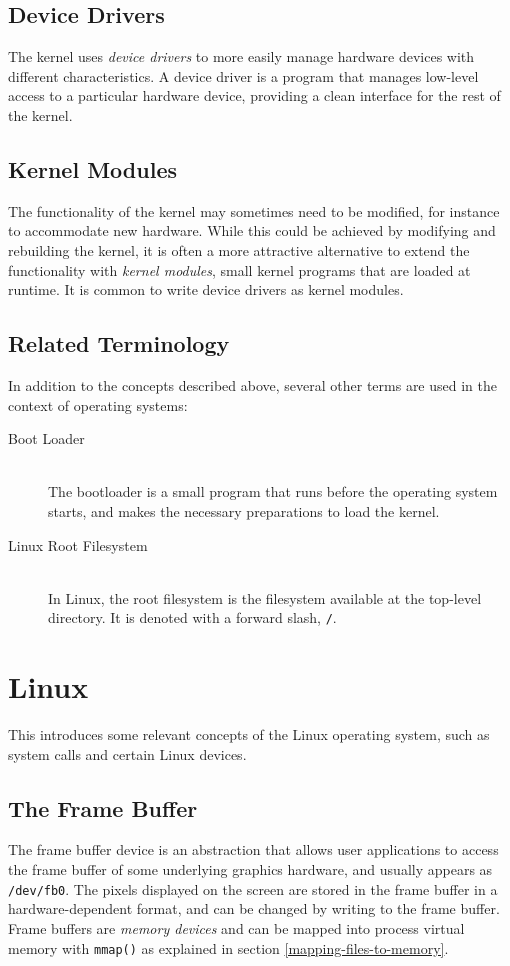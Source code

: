 \subsection{Device Drivers}
The kernel uses \emph{device drivers} to more easily manage hardware devices with different characteristics. A device driver is a program that manages low-level access to a particular hardware device, providing a clean interface for the rest of the kernel.

\subsection{Kernel Modules}\label{sec:kernel-modules}
The functionality of the kernel may sometimes need to be modified, for instance to accommodate new hardware. While this could be achieved by modifying and rebuilding the kernel, it is often a more attractive alternative to extend the functionality with \emph{kernel modules}, small kernel programs that are loaded at runtime. It is common to write device drivers as kernel modules.

\subsection{Related Terminology}
In addition to the concepts described above, several other terms are used in the context of operating systems:
\begin{description}
\item[Boot Loader] \hfill \\
The bootloader is a small program that runs before the operating system starts, and makes the necessary preparations to load the kernel.
\item[Linux Root Filesystem] \hfill \\
In Linux, the root filesystem is the filesystem available at the top-level directory. It is denoted with a forward slash, \texttt{/}.
\end{description}



\section{Linux}
This introduces some relevant concepts of the Linux operating system, such as system calls and certain Linux devices.

\subsection{The Frame Buffer}\label{sec:the-framebuffer}
The frame buffer device is an abstraction that allows user applications to access the frame buffer of some underlying graphics hardware, and usually appears as \texttt{/dev/fb0}. The pixels displayed on the screen are stored in the frame buffer in a hardware-dependent format, and can be changed by writing to the frame buffer. Frame buffers are \emph{memory devices} and can be mapped into process virtual memory with \texttt{mmap()} as explained in section \ref{mapping-files-to-memory}.\cite{linux-kernel-documentation-framebuffer}


